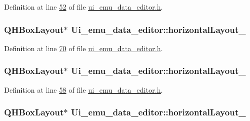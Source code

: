 Definition at line \hyperlink{a00138_source_l00052}{52} of file \hyperlink{a00138_source}{ui\+\_\+emu\+\_\+data\+\_\+editor.\+h}.

\hypertarget{a00079_aaee23fa38e3335cc652ebd35fcdbafc8}{
\subsubsection[{horizontal\+Layout\+\_\+2}]{\setlength{\rightskip}{0pt plus 5cm}Q\+H\+Box\+Layout$\ast$ Ui\+\_\+emu\+\_\+data\+\_\+editor\+::horizontal\+Layout\+\_}}\label{a00079_aaee23fa38e3335cc652ebd35fcdbafc8}


Definition at line \hyperlink{a00138_source_l00070}{70} of file \hyperlink{a00138_source}{ui\+\_\+emu\+\_\+data\+\_\+editor.\+h}.

\hypertarget{a00079_a42671894c25bd8dfcc6c0a1f8689ecb8}{
\subsubsection[{horizontal\+Layout\+\_\+4}]{\setlength{\rightskip}{0pt plus 5cm}Q\+H\+Box\+Layout$\ast$ Ui\+\_\+emu\+\_\+data\+\_\+editor\+::horizontal\+Layout\+\_}}\label{a00079_a42671894c25bd8dfcc6c0a1f8689ecb8}


Definition at line \hyperlink{a00138_source_l00058}{58} of file \hyperlink{a00138_source}{ui\+\_\+emu\+\_\+data\+\_\+editor.\+h}.

\hypertarget{a00079_ade915b192b206af66ce1fb317087ffb6}{
\subsubsection[{horizontal\+Layout\+\_\+5}]{\setlength{\rightskip}{0pt plus 5cm}Q\+H\+Box\+Layout$\ast$ Ui\+\_\+emu\+\_\+data\+\_\+editor\+::horizontal\+Layout\+\_}}\label{a00079_ade915b192b206af66ce1fb317087ffb6}


